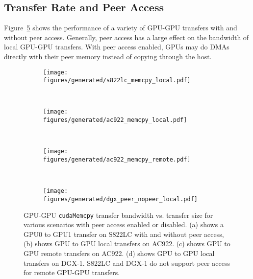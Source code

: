 \subsection{Transfer Rate and Peer Access}
\label{sec:explicit-peer-bandwidth}

Figure~\ref{fig:explicit-peer} shows the performance of a variety of GPU-GPU transfers with and without peer access.
Generally, peer access has a large effect on the bandwidth of local GPU-GPU transfers.
With peer access enabled, GPUs may do DMAs directly with their peer memory instead of copying through the host.

\begin{figure}[H]
	\centering
	\begin{subfigure}[b]{0.3\textwidth}
		\texttt{[image: figures/generated/s822lc\_memcpy\_local.pdf]}
		\caption{}
		\label{fig:explicit-s822lc-peer}
	\end{subfigure}
	~
	\begin{subfigure}[b]{0.3\textwidth}
		\texttt{[image: figures/generated/ac922\_memcpy\_local.pdf]}
		\caption{}
		\label{fig:explicit-hal-peer-local}
	\end{subfigure}
	~
	\begin{subfigure}[b]{0.3\textwidth}
		\texttt{[image: figures/generated/ac922\_memcpy\_remote.pdf]}
		\caption{}
		\label{fig:explicit-hal-peer-remote}
	\end{subfigure}
	\\
	\begin{subfigure}[b]{0.3\textwidth}
		\texttt{[image: figures/generated/dgx\_peer\_nopeer\_local.pdf]}
		\caption{}
		\label{fig:explicit-dgx-peer-nopeer-local}
	\end{subfigure}
	
	\caption[GPU-GPU \texttt{cudaMemcpy} bandwidth and peer access]{
		GPU-GPU \texttt{cudaMemcpy} transfer bandwidth vs. transfer size for various scenarios with peer access enabled or disabled.
		(a) shows a GPU0 to GPU1 transfer on S822LC with and without peer access,
		(b) shows GPU to GPU local transfers on AC922.
		(c) shows GPU to GPU remote transfers on AC922.
		(d) shows GPU to GPU local transfers on DGX-1.
		S822LC and DGX-1 do not support peer access for remote GPU-GPU transfers.
	}
	\label{fig:explicit-peer}
\end{figure}

